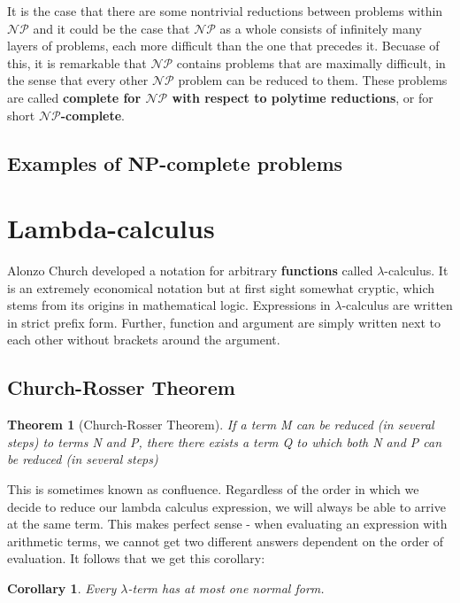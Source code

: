 \documentclass[11pt]{article}
\newtheorem{theorem}{Theorem}
\newtheorem{corollary}{Corollary}
\begin{document}
	\par 
	It is the case that there are some nontrivial reductions between problems within $\mathcal{NP}$ and it could be the case that $\mathcal{NP}$ as a whole consists of infinitely many layers of problems, each more difficult than the one that precedes it. Becuase of this, it is remarkable that $\mathcal{NP}$ contains problems that are maximally difficult, in the sense that every other $\mathcal{NP}$ problem can be reduced to them. These problems are called \textbf{complete for $\mathcal{NP}$ with respect to polytime reductions}, or for short \textbf{$\mathcal{NP}$-complete}.
	
	
	\subsection{Examples of NP-complete problems}
	
	
	
	
	\section{Lambda-calculus}
	Alonzo Church developed a notation for arbitrary \textbf{functions} called $\lambda$-calculus. It is an extremely economical notation but at first sight somewhat cryptic, which stems from its origins in mathematical logic. Expressions in $\lambda$-calculus are written in strict prefix form. Further, function and argument are simply written next to each other without brackets around the argument.
	
	
	\subsection{Church-Rosser Theorem}
	\begin{theorem}[Church-Rosser Theorem]
	If a term M can be reduced (in several steps) to terms N and P, there there exists a term Q to which both N and P can be reduced (in several steps)
	\end{theorem}

	\par This is sometimes known as confluence. Regardless of the order in which we decide to reduce our lambda calculus expression, we will always be able to arrive at the same term. This makes perfect sense - when evaluating an expression with arithmetic terms, we cannot get two different answers dependent on the order of evaluation. It follows that we get this corollary:	
	
	\begin{corollary}
	Every $\lambda$-term has at most one normal form.
	\end{corollary}
	
\end{document}
